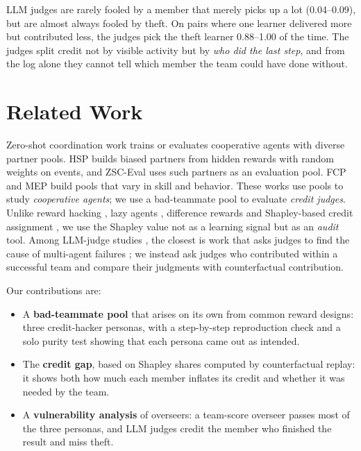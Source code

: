 \documentclass[letterpaper]{article} %
\begin{document}
LLM judges are rarely fooled by a member that merely picks up a lot (0.04--0.09), but are almost always
fooled by theft. On pairs where one learner delivered more but contributed less, the judges pick the
theft learner 0.88--1.00 of the time. The judges split credit not by visible activity but by \emph{who
did the last step}, and from the log alone they cannot tell which member the team could have done
without.

\section{Related Work}
Zero-shot coordination work trains or evaluates cooperative agents with diverse partner pools. HSP
\cite{yu2023hsp} builds biased partners from hidden rewards with random weights on events, and ZSC-Eval
\cite{wang2024zsceval} uses such partners as an evaluation pool. FCP \cite{strouse2021fcp} and MEP
\cite{zhao2023mep} build pools that vary in skill and behavior. These works use pools to study
\emph{cooperative agents}; we use a bad-teammate pool to evaluate \emph{credit judges}. Unlike reward
hacking \cite{pan2022effects,skalse2022defining}, lazy agents \cite{sunehag2018vdn}, difference rewards
\cite{foerster2018coma} and Shapley-based credit assignment \cite{wang2020shapleyq,li2021shapley}, we
use the Shapley value not as a learning signal but as an \emph{audit} tool. Among LLM-judge studies
\cite{zheng2023judging,wang2024fair}, the closest is work that asks judges to find the cause of
multi-agent failures \cite{zhang2025which}; we instead ask judges who contributed within a successful
team and compare their judgments with counterfactual contribution.

Our contributions are:
\begin{itemize}
\item A \textbf{bad-teammate pool} that arises on its own from common reward designs: three credit-hacker
      personas, with a step-by-step reproduction check and a solo purity test showing that each persona
      came out as intended.
\item The \textbf{credit gap}, based on Shapley shares computed by counterfactual replay: it shows both
      how much each member inflates its credit and whether it was needed by the team.
\item A \textbf{vulnerability analysis} of overseers: a team-score overseer passes most of the three
      personas, and LLM judges credit the member who finished the result and miss theft.
\end{itemize}
\end{document}
